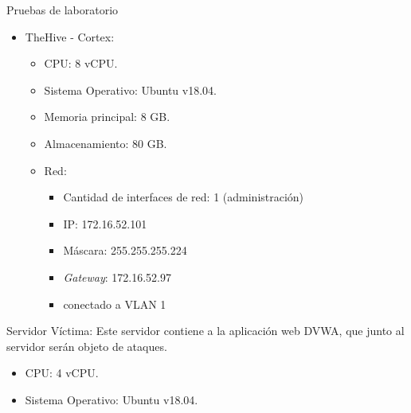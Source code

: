 \begin{section}{Pruebas de laboratorio}
\begin{itemize}
\begin{itemize}
                \item Memoria principal: 32 GB.
                \item Almacenamiento: 200 GB.
                \item Red:
                \begin{itemize}
                    \item Cantidad de interfaces de red: 2 (administración y monitoreo)
                    \item IP: 172.16.52.103 (interfaz de administración)
                    \item Máscara: 255.255.255.224
                    \item \textit{Gateway}: 172.16.52.97
                    \item conectado a VLAN 1
                \end{itemize}
            \end{itemize}
            \item TheHive - Cortex: 
            \begin{itemize}
                \item CPU: 8 vCPU.
                \item Sistema Operativo: Ubuntu v18.04.
                \item Memoria principal: 8 GB.
                \item Almacenamiento: 80 GB.
                \item Red:
                \begin{itemize}
                    \item Cantidad de interfaces de red: 1 (administración)
                    \item IP: 172.16.52.101
                    \item Máscara: 255.255.255.224
                    \item \textit{Gateway}: 172.16.52.97
                    \item conectado a VLAN 1
                \end{itemize}
            \end{itemize}
        \end{itemize}
    Servidor Víctima:
    Este servidor contiene a la aplicación web DVWA, que junto al servidor serán objeto de ataques. 
     \begin{itemize}
                \item CPU: 4 vCPU.
                \item Sistema Operativo: Ubuntu v18.04.

\end{itemize}
\end{section}
